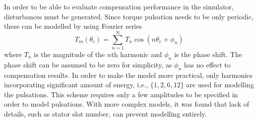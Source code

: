 In order to be able to evaluate compensation performance in the simulator, disturbances must be generated. Since torque pulsation needs to be only periodic, these can be modelled by using Fourier series
\begin{equation}
    T_m(\theta_e) = \sum_{n=1}^{\infty} T_n \cos(n \theta_e + \phi_n)
    \label{pulsation_model2}
\end{equation}  %
where $T_n$ is the magnitude of the $n$th harmonic and $\phi_n$ is the phase shift. The phase shift can be assumed to be zero for simplicity, as $\phi_n$ has no effect to compensation results. In order to make the model more practical, only harmonics incorporating significant amount of energy, i.e., $\{ 1, 2, 6, 12\}$ are used for modelling the pulsations. This scheme requires only a few amplitudes to be specified in order to model pulsations. With more complex models, it was found that lack of details, such as stator slot number, can prevent modelling entirely.






